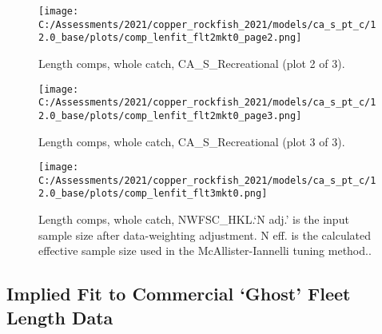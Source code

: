 \documentclass[11pt,
  english,
  a4paper,
]{article}
\begin{document}
\tagmcend\tagstructend


\begin{figure}
\centering
\texttt{[image: C:/Assessments/2021/copper\_rockfish\_2021/models/ca\_s\_pt\_c/12.0\_base/plots/comp\_lenfit\_flt2mkt0\_page2.png]}
\caption{Length comps, whole catch, CA\_S\_Recreational (plot 2 of 3).\label{fig:comp_lenfit_flt2mkt0_page2}}
\end{figure}

\tagmcend\tagstructend


\begin{figure}
\centering
\texttt{[image: C:/Assessments/2021/copper\_rockfish\_2021/models/ca\_s\_pt\_c/12.0\_base/plots/comp\_lenfit\_flt2mkt0\_page3.png]}
\caption{Length comps, whole catch, CA\_S\_Recreational (plot 3 of 3).\label{fig:comp_lenfit_flt2mkt0_page3}}
\end{figure}

\tagmcend\tagstructend


\begin{figure}
\centering
\texttt{[image: C:/Assessments/2021/copper\_rockfish\_2021/models/ca\_s\_pt\_c/12.0\_base/plots/comp\_lenfit\_flt3mkt0.png]}
\caption{Length comps, whole catch, NWFSC\_HKL.`N adj.' is the input sample size after data-weighting adjustment. N eff. is the calculated effective sample size used in the McAllister-Iannelli tuning method..\label{fig:comp_lenfit_flt3mkt0}}
\end{figure}

\tagmcend\tagstructend

\newpage


\hypertarget{implied-fit-to-commercial-ghost-fleet-length-data}{%
\subsection{Implied Fit to Commercial `Ghost' Fleet Length Data}\label{implied-fit-to-commercial-ghost-fleet-length-data}}
\end{document}
